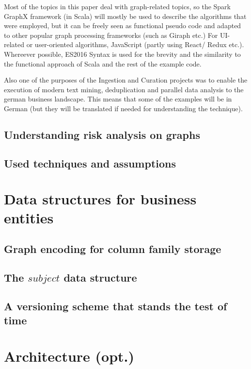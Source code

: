 \documentclass[
        a4paper,     %
        titlepage,   %
        twoside,     %
        parskip      %
        ]{scrartcl}  %
\begin{document}
    Most of the topics in this paper deal with graph-related topics, so the Spark GraphX framework
    (in Scala) will mostly be used to describe the algorithms that were employed,
    but it can be freely seen as functional pseudo code and adapted to other popular
    graph processing frameworks (such as Giraph etc.) %
    For UI-related or user-oriented algorithms, JavaScript (partly using React/ Redux etc.).
    Whereever possible, ES2016 Syntax is used for the brevity and the similarity
    to the functional approach of Scala and the rest of the example code.

    Also one of the purposes of the Ingestion and Curation projects was to enable
    the execution of modern text mining, deduplication and parallel data analysis
    to the german business landscape. This means that some of the examples will be
    in German (but they will be translated if needed for understanding the technique).

    \subsection{Understanding risk analysis on graphs}
    \subsection{Used techniques and assumptions}
    \pagebreak

  \section{Data structures for business entities}
    \subsection{Graph encoding for column family storage}
    \subsection{The $subject$ data structure}


    \subsection{A versioning scheme that stands the test of time}
    \pagebreak

  \section{Architecture (opt.)}
\end{document}

